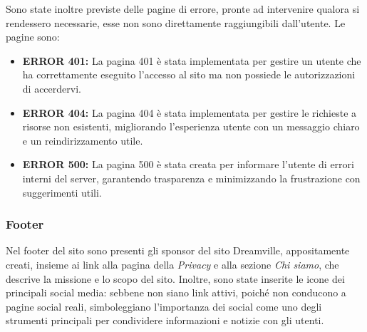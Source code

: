 Sono state inoltre previste delle pagine di errore, pronte ad intervenire qualora si rendessero necessarie, esse non sono direttamente raggiungibili dall'utente.
Le pagine sono:
\begin{itemize}
    \item \textbf{ERROR 401:} La pagina 401 è stata implementata per gestire un utente che ha correttamente eseguito l'accesso al sito ma non possiede le autorizzazioni di accerdervi.
    \item \textbf{ERROR 404:} La pagina 404 è stata implementata per gestire le richieste a risorse non esistenti, migliorando l'esperienza utente con un messaggio chiaro e un reindirizzamento utile.
    \item \textbf{ERROR 500:} La pagina 500 è stata creata per informare l'utente di errori interni del server, garantendo trasparenza e minimizzando la frustrazione con suggerimenti utili.
\end{itemize}
\subsubsection{Footer}
Nel footer del sito sono presenti gli sponsor del sito Dreamville, appositamente creati, insieme ai link alla pagina della \textit{Privacy} e alla sezione \textit{Chi siamo}, che descrive la missione e lo scopo del sito. Inoltre, sono state inserite le icone dei principali social media: sebbene non siano link attivi, poiché non conducono a pagine social reali, simboleggiano l'importanza dei social come uno degli strumenti principali per condividere informazioni e notizie con gli utenti.

